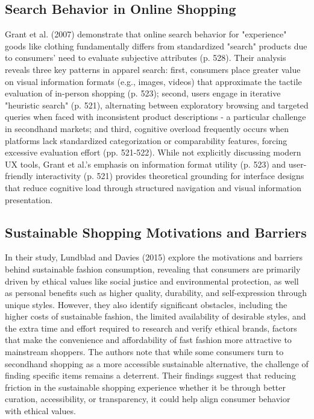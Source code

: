 \documentclass[10pt,twocolumn]{article}
\begin{document}
\subsection{Search Behavior in Online Shopping}
Grant et al. (2007)\cite{grant2007} demonstrate that online search behavior for "experience" goods like clothing fundamentally differs from standardized "search" products due to consumers' need to evaluate subjective attributes (p. 528). Their analysis reveals three key patterns in apparel search: first, consumers place greater value on visual information formats (e.g., images, videos) that approximate the tactile evaluation of in-person shopping (p. 523); second, users engage in iterative "heuristic search" (p. 521), alternating between exploratory browsing and targeted queries when faced with inconsistent product descriptions - a particular challenge in secondhand markets; and third, cognitive overload frequently occurs when platforms lack standardized categorization or comparability features, forcing excessive evaluation effort (pp. 521-522). While not explicitly discussing modern UX tools, Grant et al.'s emphasis on information format utility (p. 523) and user-friendly interactivity (p. 521) provides theoretical grounding for interface designs that reduce cognitive load through structured navigation and visual information presentation.

\subsection{Sustainable Shopping Motivations and Barriers}
In their study, Lundblad and Davies (2015)\cite{lundblad2015} explore the motivations and barriers behind sustainable fashion consumption, revealing that consumers are primarily driven by ethical values like social justice and environmental protection, as well as personal benefits such as higher quality, durability, and self-expression through unique styles. However, they also identify significant obstacles, including the higher costs of sustainable fashion, the limited availability of desirable styles, and the extra time and effort required to research and verify ethical brands, factors that make the convenience and affordability of fast fashion more attractive to mainstream shoppers. The authors note that while some consumers turn to secondhand shopping as a more accessible sustainable alternative, the challenge of finding specific items remains a deterrent. Their findings suggest that reducing friction in the sustainable shopping experience  whether it be through better curation, accessibility, or transparency, it could help align consumer behavior with ethical values.
\end{document}
